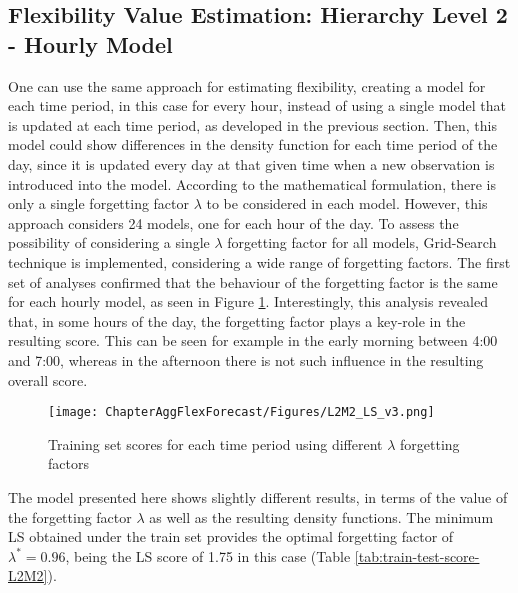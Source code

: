 \subsection{Flexibility Value Estimation: Hierarchy Level 2 - Hourly Model}  \label{Sect:ResultsLevel224hModel}

One can use the same approach for estimating flexibility, creating a model for each time period, in this case for every hour, instead of using a single model that is updated at each time period, as developed in the previous section. Then, this model could show differences in the density function for each time period of the day, since it is updated every day at that given time when a new observation is introduced into the model. According to the mathematical formulation, there is only a single forgetting factor $\lambda$ to be considered in each model. However, this approach considers 24 models, one for each hour of the day. To assess the possibility of considering a single $\lambda$ forgetting factor for all models, Grid-Search technique is implemented, considering a wide range of forgetting factors. The first set of analyses confirmed that the behaviour of the forgetting factor is the same for each hourly model, as seen in Figure \ref{fig:L2_M2_LS}. Interestingly, this analysis revealed that, in some hours of the day, the forgetting factor plays a key-role in the resulting score. This can be seen for example in the early morning between 4:00 and 7:00, whereas in the afternoon there is not such influence in the resulting overall score.  

\begin{figure}[htbp]
\centerline{\texttt{[image: ChapterAggFlexForecast/Figures/L2M2\_LS\_v3.png]}}
\caption{Training set scores for each time period using different $\lambda$ forgetting factors}
\label{fig:L2_M2_LS}
\end{figure}

The model presented here shows slightly different results, in terms of the value of the forgetting factor $\lambda$ as well as the resulting density functions. The minimum LS obtained under the train set provides the optimal forgetting factor of $\lambda^* = 0.96$, being the LS score of 1.75 in this case (Table \ref{tab:train-test-score-L2M2}). 

